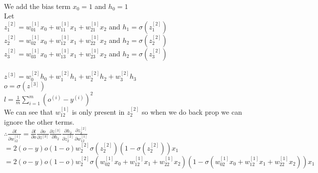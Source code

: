 \begin{answer}\\
We add the bias term $x_0=1$ and $h_0=1$\\
Let\\
$z_1^{[2]}=w_{01}^{[1]}x_0+w_{11}^{[1]}x_1+w_{21}^{[1]}x_2$ and $h_1=\sigma(z_1^{[2]})$\\
$z_2^{[2]}=w_{02}^{[1]}x_0+w_{12}^{[1]}x_1+w_{22}^{[1]}x_2$ and $h_2=\sigma(z_2^{[2]})$\\
$z_3^{[2]}=w_{03}^{[1]}x_0+w_{13}^{[1]}x_1+w_{23}^{[1]}x_2$ and $h_2=\sigma(z_3^{[2]})$\\
\\
$z^{[3]}=w_0^{[2]}h_0+w_1^{[2]}h_1+w_2^{[2]}h_2+w_3^{[2]}h_3$\\
$o=\sigma(z^{[3]})$\\
$l=\frac{1}{m}\sum_{i=1}^{m}(o^{(i)}-y^{(i)})^2$\\
We can see that $w_{12}^{[1]}$ is only present in $z_2^{[2]}$ so when we do back prop we can ignore the other terms.\\
$\therefore \frac{\partial l}{\partial w_{12}^{[1]}}=\frac{\partial l}{\partial o}\frac{\partial o}{\partial z^{[3]}}\frac{\partial z^{[3]}}{\partial h_2}\frac{\partial h_2}{\partial z_2^{[2]}}\frac{\partial z_2^{[2]}}{\partial w_{12}^{[1]}}$\\
$=2(o-y)o(1-o)w_2^{[2]} \sigma(z_2^{[2]})(1-\sigma(z_2^{[2]}))x_1$\\
$=2(o-y)o(1-o)w_2^{[2]} \sigma(w_{02}^{[1]}x_0+w_{12}^{[1]}x_1+w_{22}^{[1]}x_2)(1-\sigma(w_{02}^{[1]}x_0+w_{12}^{[1]}x_1+w_{22}^{[1]}x_2))x_1$\\
\end{answer}